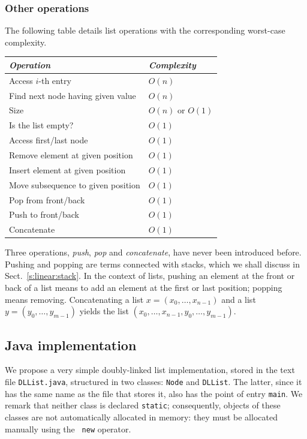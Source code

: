 \documentclass[a4paper]{book}
\theoremstyle{changebreak}                %
\begin{document}
\subsubsection{Other operations}
The following table details list operations with the corresponding
worst-case complexity.
\begin{center}
\begin{tabular}{|l|l|} \hline
{\it Operation} & {\it Complexity} \\ \hline
Access $i$-th entry & $O(n)$ \\
Find next node having given value & $O(n)$ \\
Size & $O(n)$ or $O(1)$ \\  
Is the list empty? & $O(1)$ \\
Access first/last node & $O(1)$ \\
Remove element at given position & $O(1)$ \\
Insert element at given position & $O(1)$ \\
Move subsequence to given position & $O(1)$ \\ 
Pop from front/back & $O(1)$ \\
Push to front/back & $O(1)$ \\
Concatenate & $O(1)$ \\
\hline
\end{tabular}
\end{center}

Three operations, {\it push},
{\it pop} and {\it
  concatenate}, have never been introduced
before. Pushing and popping are terms connected with
stacks, which we shall discuss in
Sect.~\ref{s:linear:stack}. In the context of lists, pushing an
element at the front or back of a list means to add
an element at the first or last position; popping
means removing. Concatenating a list
$x=(x_0,\ldots,x_{n-1})$ and a list $y=(y_0,\ldots,y_{m-1})$ yields
the list $(x_0,\ldots,x_{n-1},y_0,\ldots,y_{m-1})$.

\subsection{Java implementation}
We propose a very simple doubly-linked list
implementation, stored in
the text file {\tt DLList.java}, structured in two
classes: {\tt Node} and {\tt DLList}. The latter, since it has the
same name as the file that stores it, also has the point of
entry {\tt main}. We remark
that neither class is declared {\tt static};
consequently, objects of these classes are not automatically allocated
in memory: they must be allocated
manually using the {\tt
  new} operator.
\end{document}
